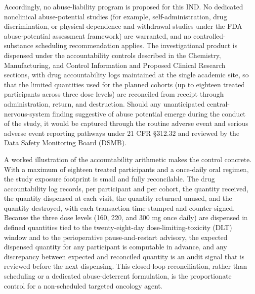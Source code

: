 Accordingly, no abuse-liability program is proposed for this IND. No dedicated
nonclinical abuse-potential studies (for example, self-administration, drug
discrimination, or physical-dependence and withdrawal studies under the FDA
abuse-potential assessment framework) are warranted, and no controlled-substance
scheduling recommendation applies. The investigational product is dispensed under
the accountability controls described in the Chemistry, Manufacturing, and Control
Information and Proposed Clinical Research sections, with drug accountability logs
maintained at the single academic site, so that the limited quantities used for the
planned cohorts (up to eighteen treated participants across three dose levels) are
reconciled from receipt through administration, return, and destruction. Should any
unanticipated central-nervous-system finding suggestive of abuse potential emerge
during the conduct of the study, it would be captured through the routine adverse
event and serious adverse event reporting pathways under 21 CFR \S 312.32 and
reviewed by the Data Safety Monitoring Board (DSMB).

A worked illustration of the accountability arithmetic makes the control concrete.
With a maximum of eighteen treated participants and a once-daily oral regimen, the
study exposure footprint is small and fully reconcilable. The drug accountability
log records, per participant and per cohort, the quantity received, the quantity
dispensed at each visit, the quantity returned unused, and the quantity destroyed,
with each transaction time-stamped and counter-signed. Because the three dose levels
(160, 220, and 300 mg once daily) are dispensed in defined quantities tied to the
twenty-eight-day dose-limiting-toxicity (DLT) window and to the perioperative
pause-and-restart advisory, the expected dispensed quantity for any participant is
computable in advance, and any discrepancy between expected and reconciled quantity
is an audit signal that is reviewed before the next dispensing. This closed-loop
reconciliation, rather than scheduling or a dedicated abuse-deterrent formulation,
is the proportionate control for a non-scheduled targeted oncology agent.

